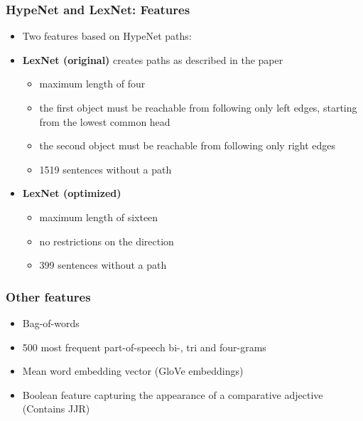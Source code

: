 \documentclass[11pt,aspectratio=169,usenames,dvipsnames]{beamer}
\begin{document}
    \begin{frame}[t]
        \frametitle{HypeNet and LexNet: Features}
        \begin{itemize}
            \item Two features based on HypeNet paths:\pause
            \item \textbf{LexNet (original)} creates paths as described in the paper
            \begin{itemize}
                \item maximum length of four
                \item the first object must be reachable from following only left edges, starting from the lowest common head
                \item the second object must be reachable from following only right edges 
                \item 1519 sentences without a path\pause
            \end{itemize}
            \item \textbf{LexNet (optimized)}
            \begin{itemize}
                \item maximum length of sixteen
                \item no restrictions on the direction
                \item 399 sentences without a path
            \end{itemize}
        \end{itemize}
    \end{frame}





    \begin{frame}[t]
        \frametitle{Other features}
        \begin{itemize}
            \item Bag-of-words
            \item 500 most frequent part-of-speech bi-, tri and four-grams
            \item Mean word embedding vector (GloVe embeddings)
            \item Boolean feature capturing the appearance of a comparative adjective (Contains JJR)
        \end{itemize}
      
    \end{frame}
    
\end{document}
